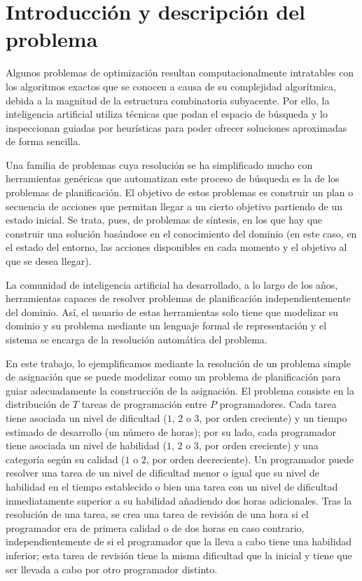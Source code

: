 
\section{Introducción y descripción del problema} \label{sec:intro}

Algunos problemas de optimización resultan computacionalmente intratables con 
los algoritmos exactos que se conocen a causa de su complejidad algorítmica, 
debida a la magnitud de la estructura combinatoria subyacente. Por ello, la 
inteligencia artificial utiliza técnicas que podan el espacio de búsqueda y 
lo inspeccionan guiadas por heurísticas para poder ofrecer soluciones 
aproximadas de forma sencilla. 

Una familia de problemas cuya resolución se ha simplificado mucho con 
herramientas genéricas que automatizan este proceso de búsqueda es la de los 
problemas de planificación. El objetivo de estos problemas es construir un 
plan o secuencia de acciones que permitan llegar a un cierto objetivo 
partiendo de un estado inicial. Se trata, pues, de problemas de síntesis, en 
los que hay que construir una solución basándose en el conocimiento del 
dominio (en este caso, en el estado del entorno, las acciones disponibles en 
cada momento y el objetivo al que se desea llegar).

La comunidad de inteligencia artificial ha desarrollado, a lo largo de los 
años, herramientas capaces de resolver problemas de planificación 
independientemente del dominio. Así, el usuario de estas herramientas solo 
tiene que modelizar su dominio y su problema mediante un lenguaje formal de 
representación y el sistema se encarga de la resolución automática del 
problema. 

En este trabajo, lo ejemplificamos mediante la resolución de un problema 
simple de asignación que se puede modelizar como un problema de planificación 
para guiar adecuadamente la construcción de la asignación. El problema 
consiste en la distribución de \(T\) tareas de programación entre \(P\) 
programadores. Cada tarea tiene asociada un nivel de dificultad (\(1\), \(2\) 
o \(3\), por orden creciente) y un tiempo estimado de desarrollo (un número 
de horas); por su lado, cada programador tiene asociada un nivel de habilidad 
(\(1\), \(2\) o \(3\), por orden creciente) y una categoría según su calidad 
(\(1\) o \(2\), por orden decreciente). Un programador puede resolver una 
tarea de un nivel de dificultad menor o igual que su nivel de habilidad en el 
tiempo establecido o bien una tarea con un nivel de dificultad inmediatamente 
superior a su habilidad añadiendo dos horas adicionales. Tras la resolución 
de una tarea, se crea una tarea de revisión de una hora si el programador era 
de primera calidad o de dos horas en caso contrario, independientemente de si 
el programador que la lleva a cabo tiene una habilidad inferior; esta tarea de 
revisión tiene la misma dificultad que la inicial y tiene que ser llevada a 
cabo por otro programador distinto.

